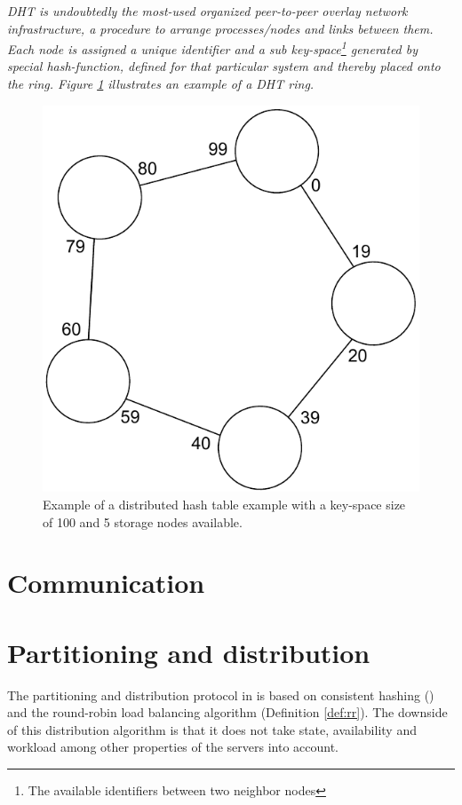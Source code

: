 \begin{definition} \label{def:dht}
\textit{DHT is undoubtedly the most-used organized peer-to-peer overlay network infrastructure, a procedure to arrange processes/nodes and links between them. Each node is assigned a unique identifier and a sub key-space\footnote{The available identifiers between two neighbor nodes}  generated by special hash-function, defined for that particular system and thereby placed onto the ring. Figure \ref{fig:dht} illustrates an example of a DHT ring.}

\begin{figure}[h!]
	\centering
	\includegraphics[scale=0.6]{pdf/dht.pdf}
	\vspace*{3mm}
	\caption[]{Example of a distributed hash table example with a key-space size of 100 and 5 storage nodes available. \label{fig:dht}}
\end{figure}
\end{definition}

\section{Communication} \label{sec:communication}

\section{Partitioning and distribution} \label{sec:pandd}
The partitioning and distribution protocol in \CodeName is based on consistent hashing () and the round-robin load balancing algorithm (Definition \ref{def:rr}). The downside of this distribution algorithm is that it does not take state, availability and workload among other properties of the servers into account. 
\newline

